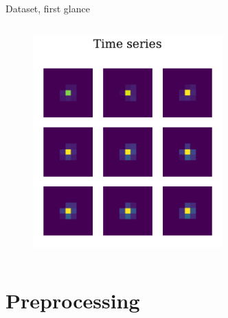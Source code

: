 \documentclass{beamer}
\begin{document}
\begin{frame}{Dataset, first glance}
\begin{columns}
         \begin{figure}
            \centering
            \includegraphics[width=0.65\textwidth]{figures/time_series.pdf}
        \end{figure}
    
    \end{columns}

\end{frame}


\section{Preprocessing}
\end{document}
